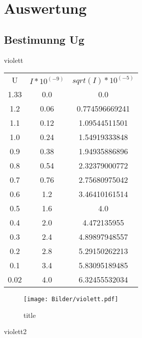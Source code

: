 \section{Auswertung}
\label{sec:Auswertung}

\subsection{Bestimunng Ug}
violett
\begin{table}
\begin{tabular}{ccc}
U & $I*10^(-9)$ & $sqrt(I)*10^(-5)$ \\
1.33 & 0.0 & 0.0 \\
1.2 & 0.06 & 0.774596669241 \\
1.1 & 0.12 & 1.09544511501 \\
1.0 & 0.24 & 1.54919333848 \\
0.9 & 0.38 & 1.94935886896 \\
0.8 & 0.54 & 2.32379000772 \\
0.7 & 0.76 & 2.75680975042 \\
0.6 & 1.2 & 3.46410161514 \\
0.5 & 1.6 & 4.0 \\
0.4 & 2.0 & 4.472135955 \\
0.3 & 2.4 & 4.89897948557 \\
0.2 & 2.8 & 5.29150262213 \\
0.1 & 3.4 & 5.83095189485 \\
0.02 & 4.0 & 6.32455532034 \\
\end{tabular}
\end{table}
\begin{figure}
  \centering
  \caption{title}
  \label{fig:jakdfn}
  \texttt{[image: Bilder/violett.pdf]}
\end{figure}





violett2


